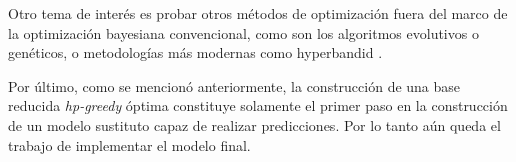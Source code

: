 
Otro tema de interés es probar otros métodos de optimización fuera del marco de la optimización bayesiana convencional, como son los algoritmos evolutivos o genéticos, o metodologías más modernas como hyperbandid \cite{li_hyperband_2018}.


Por último, como se mencionó anteriormente, la construcción de una base reducida \textit{hp-greedy} óptima constituye solamente el primer paso en la construcción de un modelo sustituto capaz de realizar predicciones. Por lo tanto aún queda el trabajo de implementar el modelo final.



